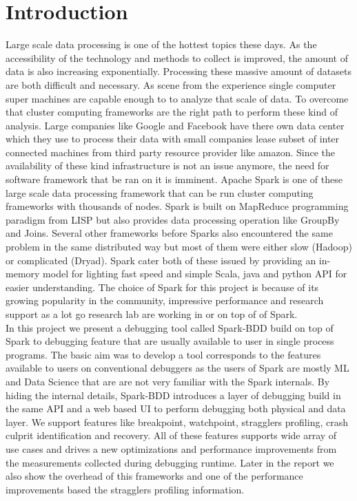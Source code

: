 \documentclass{acm_proc_article-sp}
\begin{document}
\section{Introduction}
Large scale data processing is one of the hottest topics these days. As the accessibility of the technology and methods to collect is improved, the amount of data is also increasing exponentially. Processing these massive amount of datasets are both difficult and necessary. As scene from the experience single computer super machines are capable enough to to analyze that scale of data. To overcome that cluster computing frameworks are the right path to perform these kind of analysis. Large companies like Google and Facebook have there own data center which they use to process their data with small companies lease subset of inter connected machines from third party resource provider like amazon. Since the availability of these  kind infrastructure is not an issue anymore, the need for software framework that  be ran on it is imminent. Apache Spark is one of these large scale data processing framework that can be run cluster computing frameworks with thousands of nodes. Spark is built on MapReduce programming paradigm from LISP but also provides data processing operation like GroupBy and Joins. Several other frameworks before Sparks also encountered the same problem in the same distributed way but most of them were either slow (Hadoop) or complicated (Dryad). Spark cater both of these issued by providing an in-memory model for lighting fast speed and simple Scala, java and python API for easier understanding. The choice of Spark for this project is because of its growing popularity in the community, impressive performance and research support as a lot go research lab are working in or on top of of Spark.\\
In this project we present a debugging tool called Spark-BDD build on top of Spark to debugging feature that are usually available to user in single process programs. The basic aim was to develop a tool corresponds to the features available to users on conventional debuggers as the users of Spark are mostly ML and Data Science that are are not very familiar with the Spark internals. By hiding the internal details, Spark-BDD introduces a layer of debugging build in the same API and a web based UI to perform debugging both physical and data layer. We support features like breakpoint, watchpoint, stragglers profiling, crash culprit identification and recovery. All of these features supports wide array of use cases and drives a new optimizations and performance improvements from the measurements collected during debugging runtime. Later in the report we also show the overhead of this frameworks and one of the performance improvements based the stragglers profiling information. 
\end{document}
